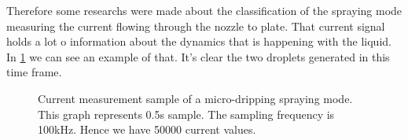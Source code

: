 Therefore some researchs were made about the classification of the spraying mode measuring the current flowing through the nozzle to plate\cite{Sjaaks}\cite{Chen_Pui}. That current signal holds a lot o information 
about the dynamics that is happening with the liquid. In \ref{fig:microdripping_current_pic} we can see an example of that. It's clear the two droplets generated in this time frame.


\begin{figure}[H]
    \centering
    \caption{Current measurement sample of a micro-dripping spraying mode. This graph represents 0.5s sample. The sampling frequency is 100kHz. Hence we have 50000 current values.}
    \label{fig:microdripping_current_pic}
  \end{figure}


\clearpage